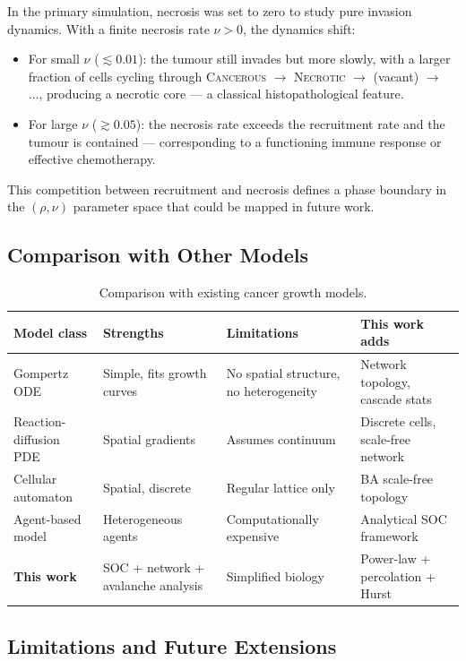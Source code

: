 \documentclass[12pt,a4paper]{article}
\begin{document}
In the primary simulation, necrosis was set to zero to study pure invasion
dynamics.  With a finite necrosis rate $\nu > 0$, the dynamics shift:
\begin{itemize}[leftmargin=1.5em]
  \item For small $\nu$ ($\lesssim 0.01$): the tumour still invades but more
        slowly, with a larger fraction of cells cycling through
        \textsc{Cancerous} $\to$ \textsc{Necrotic} $\to$ (vacant) $\to$ ..., 
        producing a necrotic core --- a classical histopathological feature.
  \item For large $\nu$ ($\gtrsim 0.05$): the necrosis rate exceeds the
        recruitment rate and the tumour is contained --- corresponding to
        a functioning immune response or effective chemotherapy.
\end{itemize}
This competition between recruitment and necrosis defines a phase boundary in
the $(\rho, \nu)$ parameter space that could be mapped in future work.

\subsection{Comparison with Other Models}

\begin{table}[H]
\centering
\caption{Comparison with existing cancer growth models.}
\label{tab:compare}
\renewcommand{\arraystretch}{1.25}
\begin{tabular}{p{3.5cm} p{3cm} p{3cm} p{3.5cm}}
\toprule
\textbf{Model class} & \textbf{Strengths} & \textbf{Limitations} & \textbf{This work adds} \\
\midrule
Gompertz ODE & Simple, fits growth curves & No spatial structure, no heterogeneity & Network topology, cascade stats \\
Reaction-diffusion PDE & Spatial gradients & Assumes continuum & Discrete cells, scale-free network \\
Cellular automaton & Spatial, discrete & Regular lattice only & BA scale-free topology \\
Agent-based model & Heterogeneous agents & Computationally expensive & Analytical SOC framework \\
\textbf{This work} & SOC + network + avalanche analysis & Simplified biology & Power-law + percolation + Hurst \\
\bottomrule
\end{tabular}
\end{table}

\subsection{Limitations and Future Extensions}
\end{document}
